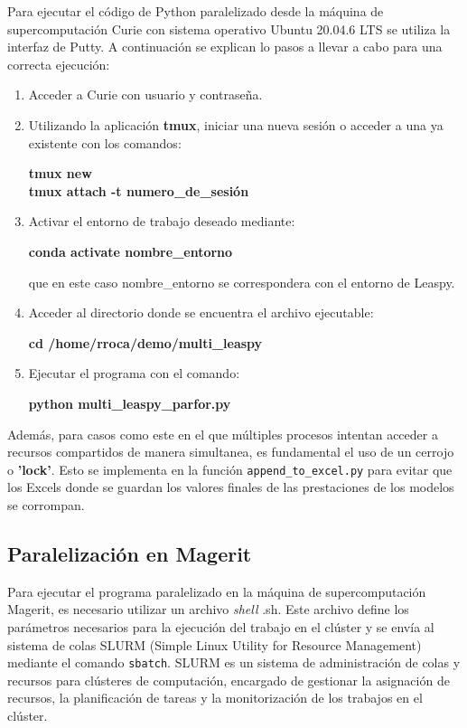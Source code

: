 Para ejecutar el código de Python paralelizado desde la máquina de supercomputación Curie con sistema operativo Ubuntu 20.04.6 LTS se utiliza la interfaz de Putty. A continuación se explican lo pasos a llevar a cabo para una correcta ejecución:
\begin{enumerate}
	\item Acceder a Curie con usuario y contraseña.
	\item Utilizando la aplicación \textbf{tmux}, iniciar una nueva sesión o acceder a una ya existente con los comandos:
	\begin{center}
		\textbf{tmux new}\\
		\textbf{tmux attach -t numero\_de\_sesión}
	\end{center}
	\item Activar el entorno de trabajo deseado mediante:
	\begin{center}
		\textbf{conda activate nombre\_entorno}
	\end{center}
	que en este caso nombre\_entorno se correspondera con el entorno de Leaspy.
	\item Acceder al directorio donde se encuentra el archivo ejecutable:
	\begin{center}
		\textbf{cd /home/rroca/demo/multi\_leaspy}
	\end{center}
	\item Ejecutar el programa con el comando:
	\begin{center}
		\textbf{python multi\_leaspy\_parfor.py}
	\end{center}
\end{enumerate}

Además, para casos como este en el que múltiples procesos intentan acceder a recursos compartidos de manera simultanea, es fundamental el uso de un cerrojo o \textbf{'lock'}. Esto se implementa en la función \texttt{append\_to\_excel.py} para evitar que los Excels donde se guardan los valores finales de las prestaciones de los modelos se corrompan.\\

\subsection{Paralelización en Magerit}
Para ejecutar el programa paralelizado en la máquina de supercomputación Magerit, es necesario utilizar un archivo \textit{shell} .sh.  Este archivo define los parámetros necesarios para la ejecución del trabajo en el clúster y se envía al sistema de colas SLURM (Simple Linux Utility for Resource Management) mediante el comando \texttt{sbatch}. SLURM es un sistema de administración de colas y recursos para clústeres de computación, encargado de gestionar la asignación de recursos, la planificación de tareas y la monitorización de los trabajos en el clúster.\\

